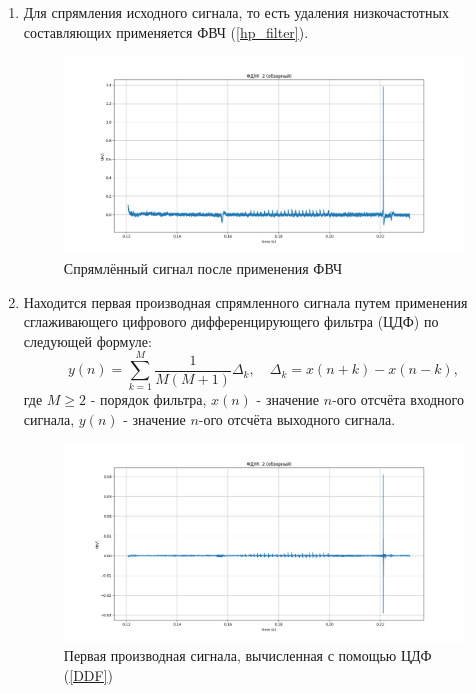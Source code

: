 \documentclass[12pt,a4paper]{article}
\begin{document}
\begin{enumerate}
				
				\item Для спрямления исходного сигнала, то есть удаления низкочастотных составляющих применяется ФВЧ (\ref{hp_filter}).
				\FloatBarrier
				\begin{figure}[h!]
					\centering\includegraphics[width=1\linewidth]{./../plots/signal_hp_filtered.png}
					\caption{Спрямлённый сигнал после применения ФВЧ}
				\end{figure}
				\FloatBarrier
				
				\item Находится первая производная спрямленного сигнала путем применения сглаживающего цифрового дифференцирующего фильтра (ЦДФ) \cite{DDF} по следующей формуле:
					\begin{equation}\label{DDF}
						y(n) = \sum_{k=1}^{M}\frac{1}{M(M+1)}\Delta_k, \quad \Delta_k = x(n+k) - x(n-k),
					\end{equation}
					где $M \geq 2$ - порядок фильтра, $x(n)$ - значение $n$-ого отсчёта входного сигнала, $y(n)$ - значение $n$-ого отсчёта выходного сигнала.
				\FloatBarrier
				\begin{figure}[h!]
					\centering\includegraphics[width=1\linewidth]{./../plots/signal_1st_der.png}
					\caption{Первая производная сигнала, вычисленная с помощью ЦДФ (\ref{DDF})}
				\end{figure}
				\FloatBarrier
				

\end{enumerate}
\end{document}

